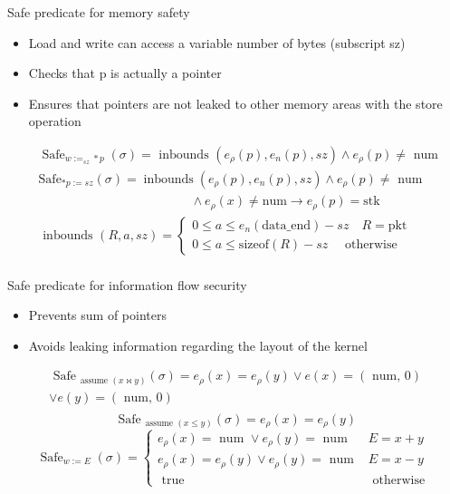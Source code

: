 \documentclass[aspectratio=169]{beamer}
\begin{document}
\begin{frame}{Safe predicate for memory safety}
\begin{itemize}
  \item Load and write can access a variable number of bytes (subscript sz)
  \item Checks that p is actually a pointer
  \item Ensures that pointers are not leaked to other memory areas with the store operation
\end{itemize}

$$
\begin{aligned} &
    \operatorname{Safe}_{w:=_{s z} * p}(\sigma)=\text { inbounds }\left(e_\rho(p), e_n(p), s z\right) \wedge e_\rho(p) \neq \text { num } \\ &
    \mathrm{Safe}_{* p:=s z}(\sigma)=\operatorname{inbounds}\left(e_\rho(p), e_n(p), s z\right) \wedge e_\rho(p) \neq \text { num } \\ &
    \qquad \qquad \qquad \qquad \qquad \qquad \wedge e_\rho(x) \neq \mathrm{num} \rightarrow e_\rho(p)=\mathrm{stk} \\ &
    \text { inbounds }(R, a, s z)= \left\{\begin{array}{l}0 \leq a \leq e_{n} (\text{data\_end})-sz \quad R=\mathrm{pkt} \\ 0 \leq a \leq \text {sizeof}(R)-sz \quad \text { otherwise }\end{array}\right.\\ &
\end{aligned}
$$
\end{frame}

\begin{frame}{Safe predicate for information flow security}
\begin{itemize}
\item Prevents sum of pointers
\item Avoids leaking information regarding the layout of the kernel
\end{itemize}

$$
\begin{aligned}
\text { Safe }_{\text {assume }(x \bowtie y)}(\sigma)=e_\rho(x)=e_\rho(y) \vee e(x)=(\text { num, } 0) \\
\vee e(y)=(\text { num, } 0) \\
\end{aligned}
$$
$$
\text { Safe }_{\text {assume }(x \leq y)}(\sigma)=e_\rho(x)=e_\rho(y)
$$
$$
\operatorname{Safe}_{w:=E}(\sigma)= \begin{cases}e_\rho(x)=\text { num } \vee e_\rho(y)=\text { num } & E=x+y \\ e_\rho(x)=e_\rho(y) \vee e_\rho(y)=\text { num } & E=x-y \\ \text { true } & \text { otherwise }\end{cases}
$$
\end{frame}
\end{document}
